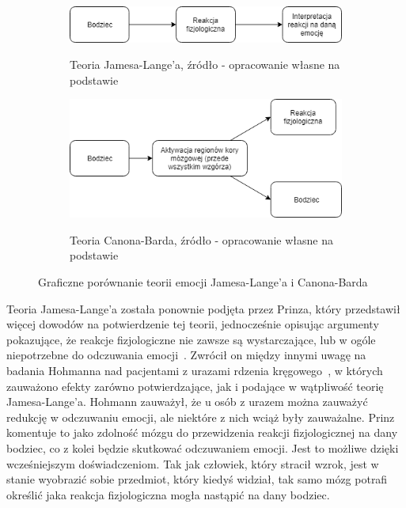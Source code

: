 \begin{figure}[h]
	\centering
	\begin{subfigure}{0.7\textwidth}
		\includegraphics[width=\linewidth]{images/james-lang.png}
		\label{fig:james}
		\caption{Teoria Jamesa-Lange'a, źródło - opracowanie własne na podstawie~\cite{Coleman2011}}
	\end{subfigure}
	\begin{subfigure}{0.7\textwidth}
		\includegraphics[width=\linewidth]{images/cannon-bard.png}
		\label{fig:canon}
		\caption{Teoria Canona-Barda, źródło - opracowanie własne na podstawie~\cite{cannon_1927}}
	\end{subfigure}
	\caption{Graficzne porównanie teorii emocji Jamesa-Lange'a i Canona-Barda}
\end{figure}

Teoria Jamesa-Lange'a została ponownie podjęta przez Prinza, który przedstawił więcej dowodów na potwierdzenie tej teorii, jednocześnie opisując argumenty pokazujące, że reakcje fizjologiczne nie zawsze są wystarczające, lub w ogóle niepotrzebne do odczuwania emocji~\cite{Prinz2004-PRIEE-2}. Zwrócił on między innymi uwagę na badania Hohmanna nad pacjentami z urazami rdzenia kręgowego~\cite{Hohmann1966SomeEO}, w których zauważono efekty zarówno potwierdzające, jak i podające w wątpliwość teorię Jamesa-Lange'a. Hohmann zauważył, że u osób z urazem można zauważyć redukcję w odczuwaniu emocji, ale niektóre z nich wciąż były zauważalne. Prinz komentuje to jako zdolność mózgu do przewidzenia reakcji fizjologicznej na dany bodziec, co z kolei będzie skutkować odczuwaniem emocji. Jest to możliwe dzięki wcześniejszym doświadczeniom. Tak jak człowiek, który stracił wzrok, jest w stanie wyobrazić sobie przedmiot, który kiedyś widział, tak samo mózg potrafi określić jaka reakcja fizjologiczna mogła nastąpić na dany bodziec.

